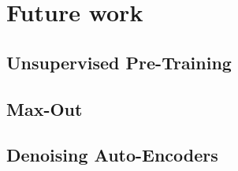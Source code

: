\chapter {Future work}

	\section{Unsupervised Pre-Training}
	\section{Max-Out}
	\section{Denoising Auto-Encoders}